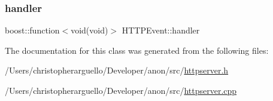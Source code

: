 \mbox{\label{class_h_t_t_p_event_a61e7b99b180ddd304a524c2a27063c4c}} 
\subsubsection{\texorpdfstring{handler}{handler}}
{\footnotesize\ttfamily boost\+::function$<$void(void)$>$ H\+T\+T\+P\+Event\+::handler}



The documentation for this class was generated from the following files\+:\begin{DoxyCompactItemize}
\item 
/\+Users/christopherarguello/\+Developer/anon/src/\mbox{\hyperlink{httpserver_8h}{httpserver.\+h}}\item 
/\+Users/christopherarguello/\+Developer/anon/src/\mbox{\hyperlink{httpserver_8cpp}{httpserver.\+cpp}}\end{DoxyCompactItemize}

